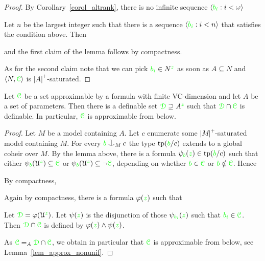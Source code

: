 \begin{proof}
  By Corollary~\ref{corol_altrank}, there is no infinite sequence $\langle{\color{green}b_i}:i<\omega\rangle$


Let $n$ be the largest integer such that there is a sequence $\langle{\color{green}b_i}:i<n\rangle$ that satisfies the condition above. Then


and the first claim of the lemma follows by compactness. 

As for the second claim note that we can pick ${\color{green} b_i}\in N^{\color{green} z}$ as soon as $A\subseteq N$ and $\langle N,{\color{green}\EuScript C}\rangle$ is $|A|^+$-saturated.
\end{proof}

\begin{corollary}\label{corol_honest}
  Let ${\color{green}\EuScript C}$ be a set approximable by a formula with finite VC-dimension and let $A$ be a set of parameters.
  Then there is a definable set ${\color{green}\EuScript D}\supseteq A^{\color{green} z}$ such that ${\color{green}\EuScript D}\cap{\color{green}\EuScript C}$ is definable.
  In particular, ${\color{green}\EuScript C}$ is approximable from below.
\end{corollary}

\begin{proof}
  Let $M$ be a model containing $A$.
  Let $c$ enumerate some $|M|^+$-saturated model containing $M$.
  For every ${\gr b}\cnonfork_Mc$ the type ${\rm tp}({\color{green} b}/c)$ extends to a global coheir over $M$. 
  By the lemma above, there is a formula $\psi_{\color{green} b}({\color{green} z})\in{\rm tp}({\color{green} b}/c)$ such that either $\psi_{\color{green} b}(\EuScript U^{\color{green} z})\subseteq{\color{green}\EuScript C}$ or $\psi_{\color{green} b}(\EuScript U^{\color{green} z})\subseteq\neg{\color{green}\EuScript C}$, depending on whether ${\color{green} b}\in{\color{green}\EuScript C}$ or ${\color{green} b}\notin{\color{green}\EuScript C}$.
  Hence


  By compactness,
  

  Again by compactness, there is a formula $\varphi({\color{green} z})$ such that 
  

  Let ${\color{green}\EuScript D}=\varphi(\EuScript U^{\color{green} z})$.
  Let $\psi({\color{green} z})$ is the disjunction of those $\psi_{\color{green} b_i}({\color{green} z})$ such that ${\color{green} b_i}\in {\color{green}\EuScript C}$.
  Then  ${\color{green}\EuScript D}\cap{\color{green}\EuScript C}$ is defined by $\varphi({\color{green} z})\wedge\psi({\color{green} z})$.

  As ${\color{green}\EuScript C}=_A{\color{green}\EuScript D}\cap{\color{green}\EuScript C}$, we obtain in particular that ${\color{green}\EuScript C}$ is approximable from below, see Lemma~\ref{lem_approx_nonunif}.
\end{proof}

